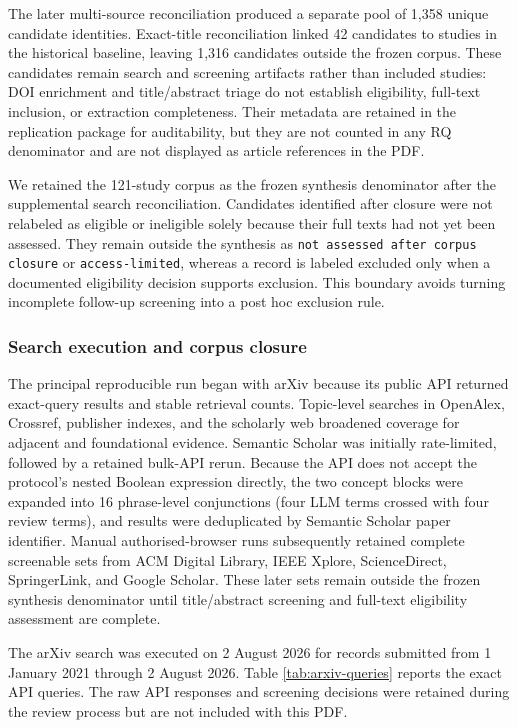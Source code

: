 \documentclass[10pt]{article}
\begin{document}
The later multi-source reconciliation produced a separate pool of 1,358 unique candidate identities. Exact-title reconciliation linked 42 candidates to studies in the historical baseline, leaving 1,316 candidates outside the frozen corpus. These candidates remain search and screening artifacts rather than included studies: DOI enrichment and title/abstract triage do not establish eligibility, full-text inclusion, or extraction completeness. Their metadata are retained in the replication package for auditability, but they are not counted in any RQ denominator and are not displayed as article references in the PDF.

We retained the 121-study corpus as the frozen synthesis denominator after the supplemental search reconciliation. Candidates identified after closure were not relabeled as eligible or ineligible solely because their full texts had not yet been assessed. They remain outside the synthesis as \texttt{not assessed after corpus closure} or \texttt{access-limited}, whereas a record is labeled excluded only when a documented eligibility decision supports exclusion. This boundary avoids turning incomplete follow-up screening into a post hoc exclusion rule.

\subsubsection{Search execution and corpus closure}

The principal reproducible run began with arXiv because its public API returned exact-query results and stable retrieval counts. Topic-level searches in OpenAlex, Crossref, publisher indexes, and the scholarly web broadened coverage for adjacent and foundational evidence. Semantic Scholar was initially rate-limited, followed by a retained bulk-API rerun. Because the API does not accept the protocol's nested Boolean expression directly, the two concept blocks were expanded into 16 phrase-level conjunctions (four LLM terms crossed with four review terms), and results were deduplicated by Semantic Scholar paper identifier. Manual authorised-browser runs subsequently retained complete screenable sets from ACM Digital Library, IEEE Xplore, ScienceDirect, SpringerLink, and Google Scholar. These later sets remain outside the frozen synthesis denominator until title/abstract screening and full-text eligibility assessment are complete.

The arXiv search was executed on 2 August 2026 for records submitted from 1 January 2021 through 2 August 2026. Table \ref{tab:arxiv-queries} reports the exact API queries. The raw API responses and screening decisions were retained during the review process but are not included with this PDF.
\end{document}
